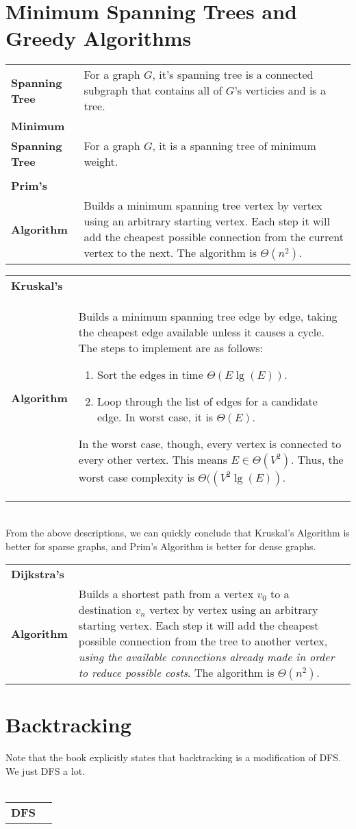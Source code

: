 \documentclass[aip, jmp, amsmath,amssymb, reprint]{revtex4-1}
\theoremstyle{definition}
\begin{document}
\section{Minimum Spanning Trees and Greedy Algorithms}
\begin{tabular}{p{2cm} p{5cm} }
    \textbf{Spanning Tree} & For a graph $G$, it's spanning tree is a connected subgraph that contains all of $G$'s verticies and is a tree.\\
    \textbf{Minimum}\\ \textbf{Spanning Tree} & For a graph $G$, it is a spanning tree of minimum weight.\\\\
    \textbf{Prim's}\\ \textbf{Algorithm} & Builds a minimum spanning tree vertex by vertex using an arbitrary starting vertex. Each step it will add the cheapest possible connection from the current vertex to the next. The algorithm is $\Theta(n^2)$.
\end{tabular}
\begin{tabular}{p{2cm} p{5cm} }
    \textbf{Kruskal's}\\ \textbf{Algorithm} & \parbox[t]{5cm}{
    Builds a minimum spanning tree edge by edge, taking the cheapest edge available unless it causes a cycle. The steps to implement are as follows:
    \begin{enumerate}
        \item Sort the edges in time $\Theta(E \lg(E))$.
        \item Loop through the list of edges for a candidate edge. In worst case, it is $\Theta(E)$.
    \end{enumerate}
    In the worst case, though, every vertex is connected to every other vertex. This means $E \in \Theta(V^2)$. Thus, the worst case complexity is $\Theta((V^2 \lg(E))$.
    }
\end{tabular}\\
From the above descriptions, we can quickly conclude that Kruskal's Algorithm is better for sparse graphs, and Prim's Algorithm is better for dense graphs.\\
\begin{tabular}{p{2cm} p{5cm} }
    \textbf{Dijkstra's}\\ \textbf{Algorithm} & \parbox[t]{5cm}{
    Builds a shortest path from a vertex $v_0$ to a destination $v_n$ vertex by vertex using an arbitrary starting vertex. Each step it will add the cheapest possible connection from the tree to another vertex, \textit{using the available connections already made in order to reduce possible costs}. The algorithm is $\Theta(n^2)$.
    }
\end{tabular}

\section{Backtracking}
Note that the book explicitly states that backtracking is a modification of DFS. We just DFS a lot.\\\\
\begin{tabular}{p{2cm} p{5cm} }
    \textbf{DFS} & 
\end{tabular}
\end{document}
